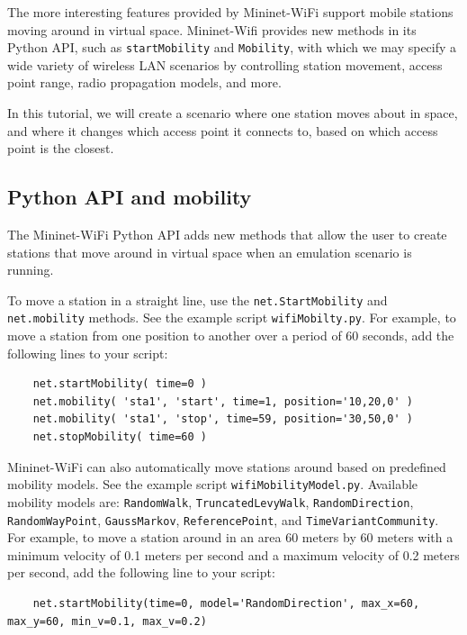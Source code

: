 The more interesting features provided by Mininet-WiFi support mobile stations moving around in virtual space. Mininet-Wifi provides new methods in its Python API, such as \texttt{startMobility} and \texttt{Mobility}, with which we may specify a wide variety of wireless LAN scenarios by controlling station movement, access point range, radio propagation models, and more.

In this tutorial, we will create a scenario where one station moves about in space, and where it changes which access point it connects to, based on which access point is the closest.

\subsection{Python API and mobility}

The Mininet-WiFi Python API adds new methods that allow the user to create stations that move around in virtual space when an emulation scenario is running.

To move a station in a straight line, use the \texttt{net.StartMobility} and \texttt{net.mobility} methods. See the example script \texttt{wifiMobilty.py}. For example, to move a station from one position to another over a period of 60 seconds, add the following lines to your script:

\begin{verbatim}
    net.startMobility( time=0 )
    net.mobility( 'sta1', 'start', time=1, position='10,20,0' )
    net.mobility( 'sta1', 'stop', time=59, position='30,50,0' )
    net.stopMobility( time=60 )
\end{verbatim}

    

Mininet-WiFi can also automatically move stations around based on predefined mobility models. See the example script \texttt{wifiMobilityModel.py}. Available mobility models are: \texttt{RandomWalk}, \texttt{TruncatedLevyWalk}, \texttt{RandomDirection}, \texttt{RandomWayPoint}, \texttt{GaussMarkov}, \texttt{ReferencePoint}, and \texttt{TimeVariantCommunity}. For example, to move a station around in an area 60 meters by 60 meters with a minimum velocity of 0.1 meters per second and a maximum velocity of 0.2 meters per second, add the following line to your script:

\begin{verbatim}
    net.startMobility(time=0, model='RandomDirection', max_x=60, max_y=60, min_v=0.1, max_v=0.2)
\end{verbatim}    

